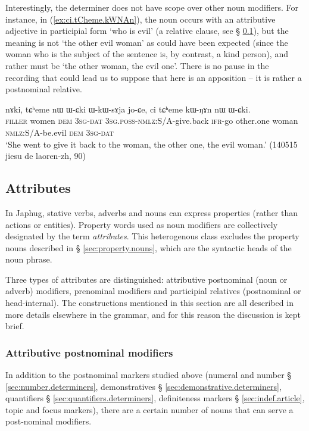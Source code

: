 Interestingly, the determiner  does not have scope over other noun modifiers. For instance, in (\ref{ex:ci.tCheme.kWNAn}), the noun  occurs with an attributive adjective in participial form  `who is evil' (a relative clause, see § \ref{sec:attributes}), but the meaning is not `the other evil woman' as could have been expected (since the woman who is the subject of the sentence is, by contrast, a kind person), and rather must be `the other woman, the evil one'. There is no pause in the recording that could lead us to suppose that  here is an apposition -- it is rather a postnominal relative.

\begin{exe}
\ex \label{ex:ci.tCheme.kWNAn}
\gll nɤki, tɕʰeme nɯ ɯ-ɕki ɯ-kɯ-sɤja jo-ɕe, ci tɕʰeme kɯ-ŋɤn nɯ ɯ-ɕki. \\
\textsc{filler} women \textsc{dem} \textsc{3sg}-\textsc{dat} \textsc{3sg}.\textsc{poss}-\textsc{nmlz}:S/A-give.back \textsc{ifr}-go other.one woman \textsc{nmlz}:S/A-be.evil \textsc{dem} \textsc{3sg}-\textsc{dat} \\
\glt `She went to give it back to the woman, the other one, the evil woman.' (140515 jiesu de laoren-zh, 90)
\end{exe}


\subsection{Attributes} \label{sec:attributes}
In Japhug, stative verbs, adverbs and nouns can express properties (rather than actions or entities). Property words used as noun modifiers are collectively designated by the term \textit{attributes}. This heterogenous class excludes the property nouns described in § \ref{sec:property.nouns}, which are the syntactic heads of the noun phrase.

Three types of attributes are distinguished: attributive postnominal (noun or adverb) modifiers, prenominal modifiers and participial  relatives (postnominal or head-internal). The constructions mentioned in this section are all described in more details elsewhere in the grammar, and for this reason the discussion is kept brief.

\subsubsection{Attributive postnominal modifiers} \label{ex:attributive.postnominal}
In addition to the postnominal markers studied above (numeral and number § \ref{sec:number.determiners}, demonstratives § \ref{sec:demonstrative.determiners}, quantifiers § \ref{sec:quantifiers.determiners}, definiteness markers § \ref{sec:indef.article}, topic and focus markers), there are a certain number of nouns that can serve a post-nominal modifiers.

